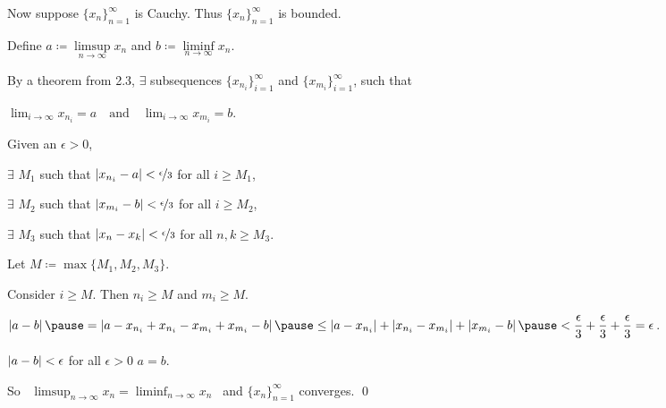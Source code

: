 \documentclass[10pt,aspectratio=169]{beamer}
\begin{document}
\begin{frame}

Now suppose $\{ x_n \}_{n=1}^\infty$ is Cauchy.  \pause Thus
$\{x_n\}_{n=1}^\infty$ is bounded.

\pause
\medskip

Define $a \coloneqq \limsup\limits_{n\to \infty} x_n$ and
$b \coloneqq \liminf\limits_{n\to \infty} x_n$.

\pause
By a theorem from 2.3, $\exists$ subsequences
$\{ x_{n_i} \}_{i=1}^\infty$ and
$\{ x_{m_i} \}_{i=1}^\infty$, such that

$\displaystyle
\lim_{i\to\infty} x_{n_i} = a
\quad \text{and} \quad
\lim_{i\to\infty} x_{m_i} = b$.

\pause
\medskip

Given an $\epsilon > 0$,

\pause
$\exists$
$M_1$ such that
$\left\lvert {x_{n_i} - a} \right\rvert < \nicefrac{\epsilon}{3}$ for all $i \geq M_1$,

\pause
$\exists$
$M_2$ such that
$\left\lvert {x_{m_i} - b} \right\rvert < \nicefrac{\epsilon}{3}$ for all $i \geq M_2$,

\pause
$\exists$
$M_3$ such that
$\left\lvert {x_n-x_k} \right\rvert < \nicefrac{\epsilon}{3}$ for all $n,k \geq M_3$.

\pause
Let $M \coloneqq \max \{ M_1, M_2, M_3 \}$.

\pause
\medskip

Consider $i \geq M$. \pause  Then $n_i \geq M$ and $m_i \geq M$.

\pause
\medskip

$\displaystyle
\abs{a-b}
\pause
=
\abs{a-x_{n_i}+x_{n_i}
-x_{m_i}+x_{m_i}
-b}
%
\pause
%
\leq
\abs{a-x_{n_i}}
+ \abs{x_{n_i} -x_{m_i}}
+ \abs{x_{m_i} -b}
\pause
 <
\frac{\epsilon}{3}
+
\frac{\epsilon}{3}
+
\frac{\epsilon}{3}
= \epsilon$.

\pause
\medskip

$\left\lvert {a-b} \right\rvert < \epsilon$ for all $\epsilon > 0$ \wthus $a=b$.

\pause
\medskip

So ~$\displaystyle \limsup_{n\to\infty} x_n = \liminf_{n\to\infty} x_n$~ and
$\{ x_n \}_{n=1}^\infty$ converges.
\qed

\end{frame}
\end{document}
